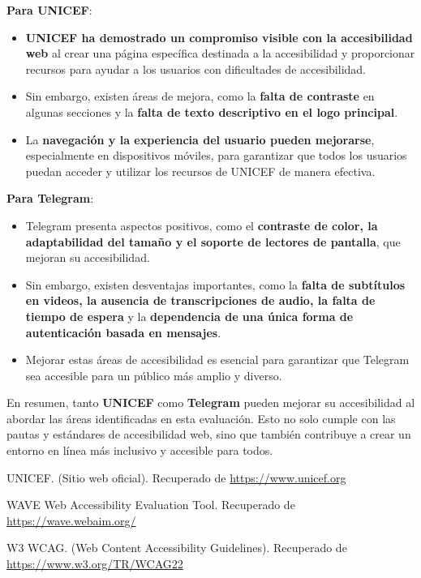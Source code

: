 \documentclass[a4paper]{article}
\begin{document}
    \textbf{Para UNICEF}:
    \begin{itemize}
        \item \textbf{UNICEF ha demostrado un compromiso visible con la accesibilidad web} al crear una página específica destinada a la accesibilidad y proporcionar recursos para ayudar a los usuarios con dificultades de accesibilidad.
        \item Sin embargo, existen áreas de mejora, como la \textbf{falta de contraste} en algunas secciones y la \textbf{falta de texto descriptivo en el logo principal}.
        \item La \textbf{navegación y la experiencia del usuario pueden mejorarse}, especialmente en dispositivos móviles, para garantizar que todos los usuarios puedan acceder y utilizar los recursos de UNICEF de manera efectiva.
    \end{itemize}
    
    \textbf{Para Telegram}:
    \begin{itemize}
        \item Telegram presenta aspectos positivos, como el \textbf{contraste de color, la adaptabilidad del tamaño y el soporte de lectores de pantalla}, que mejoran su accesibilidad.
        \item Sin embargo, existen desventajas importantes, como la \textbf{falta de subtítulos en videos, la ausencia de transcripciones de audio, la falta de tiempo de espera} y la \textbf{dependencia de una única forma de autenticación basada en mensajes}.
        \item Mejorar estas áreas de accesibilidad es esencial para garantizar que Telegram sea accesible para un público más amplio y diverso.
    \end{itemize}

    \newpage
    
    En resumen, tanto \textbf{UNICEF} como \textbf{Telegram} pueden mejorar su accesibilidad al abordar las áreas identificadas en esta evaluación. Esto no solo cumple con las pautas y estándares de accesibilidad web, sino que también contribuye a crear un entorno en línea más inclusivo y accesible para todos.
    
    \renewcommand{\refname}{4.\hspace{0.6cm}Bibliografía}
    
    \begin{thebibliography}{9}
         UNICEF. (Sitio web oficial). Recuperado de \url{https://www.unicef.org}
        
         WAVE Web Accessibility Evaluation Tool. Recuperado de \url{https://wave.webaim.org/}
    
         W3 WCAG. (Web Content Accessibility Guidelines). Recuperado de \url{https://www.w3.org/TR/WCAG22}
    \end{thebibliography}
\end{document}
